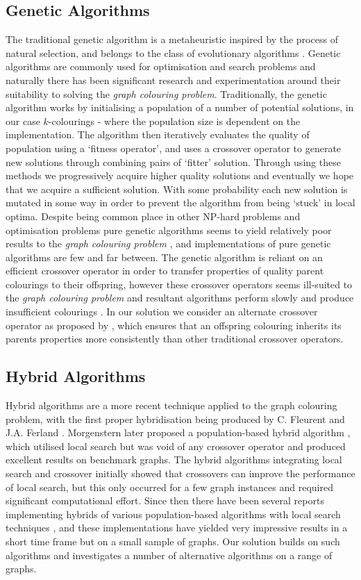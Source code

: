 \documentclass[12pt,a4paper]{article}
\begin{document}
\subsection*{Genetic Algorithms}
The traditional genetic algorithm is a metaheuristic inspired by the process of natural selection, and belongs to the class of evolutionary algorithms \cite{Vose}. Genetic algorithms are commonly used for optimisation and search problems and naturally there has been significant research and experimentation around their suitability to solving the \textit{graph colouring problem}. Traditionally, the genetic algorithm works by initialising a population of a number of potential solutions, in our case $k$-colourings - where the population size is dependent on the implementation. The algorithm then iteratively evaluates the quality of population using a `fitness operator', and uses a crossover operator to generate new solutions through combining pairs of `fitter' solution. Through using these methods we progressively acquire higher quality solutions and eventually we hope that we acquire a sufficient solution. With some probability each new solution is mutated in some way in order to prevent the algorithm from being `stuck' in local optima. Despite being common place in other NP-hard problems and optimisation problems pure genetic algorithms seems to yield relatively poor results to the \textit{graph colouring problem} \cite{Davis}, and implementations of pure genetic algorithms are few and far between. The genetic algorithm is reliant on an efficient crossover operator in order to transfer properties of quality parent colourings to their offspring, however these crossover operators seems ill-suited to the \textit{graph colouring problem} and resultant algorithms perform slowly and produce insufficient colourings \cite{Davis}. In our solution we consider an alternate crossover operator as proposed by \cite{Hao}, which ensures that an offspring colouring inherits its parents properties more consistently than other traditional crossover operators.

\subsection*{Hybrid Algorithms}
Hybrid algorithms are a more recent technique applied to the graph colouring problem, with the first proper hybridisation being produced by C. Fleurent and J.A. Ferland \cite{Johnson}. Morgenstern later proposed a population-based hybrid algorithm \cite{Johnson}, which utilised local search but was void of any crossover operator and produced excellent results on benchmark graphs. The hybrid algorithms integrating local search and crossover initially showed that crossovers can improve the performance of local search, but this only occurred for a few graph instances and required significant computational effort. Since then there have been several reports implementing hybrids of various population-based algorithms with local search techniques \cite{Hao}, and these implementations have yielded very impressive results in a short time frame but on a small sample of graphs. Our solution builds on such algorithms and investigates a number of alternative algorithms on a range of graphs.
\end{document}
